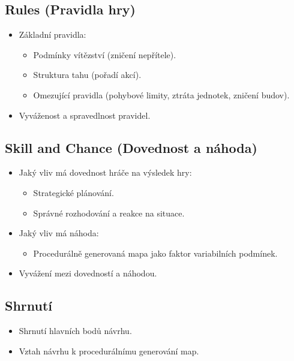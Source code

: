 \subsection{Rules (Pravidla hry)}
\begin{itemize}
    \item Základní pravidla:
    \begin{itemize}
        \item Podmínky vítězství (zničení nepřítele).
        \item Struktura tahu (pořadí akcí).
        \item Omezující pravidla (pohybové limity, ztráta jednotek, zničení budov).
    \end{itemize}
    \item Vyváženost a spravedlnost pravidel.
\end{itemize}

\subsection{Skill and Chance (Dovednost a náhoda)}
\begin{itemize}
    \item Jaký vliv má dovednost hráče na výsledek hry:
    \begin{itemize}
        \item Strategické plánování.
        \item Správné rozhodování a reakce na situace.
    \end{itemize}
    \item Jaký vliv má náhoda:
    \begin{itemize}
        \item Procedurálně generovaná mapa jako faktor variabilních podmínek.
    \end{itemize}
    \item Vyvážení mezi dovedností a náhodou.
\end{itemize}

\subsection{Shrnutí}
\begin{itemize}
    \item Shrnutí hlavních bodů návrhu.
    \item Vztah návrhu k procedurálnímu generování map.
\end{itemize}
